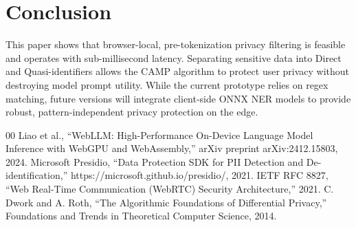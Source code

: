 \documentclass[conference]{IEEEtran}
\begin{document}
\section{Conclusion}

This paper shows that browser-local, pre-tokenization privacy filtering is feasible and operates with sub-millisecond latency. Separating sensitive data into Direct and Quasi-identifiers allows the CAMP algorithm to protect user privacy without destroying model prompt utility. While the current prototype relies on regex matching, future versions will integrate client-side ONNX NER models to provide robust, pattern-independent privacy protection on the edge.

\begin{thebibliography}{00}
 Liao et al., ``WebLLM: High-Performance On-Device Language Model Inference with WebGPU and WebAssembly,'' arXiv preprint arXiv:2412.15803, 2024.
 Microsoft Presidio, ``Data Protection SDK for PII Detection and De-identification,'' https://microsoft.github.io/presidio/, 2021.
 IETF RFC 8827, ``Web Real-Time Communication (WebRTC) Security Architecture,'' 2021.
 C. Dwork and A. Roth, ``The Algorithmic Foundations of Differential Privacy,'' Foundations and Trends in Theoretical Computer Science, 2014.
\end{thebibliography}
\end{document}
